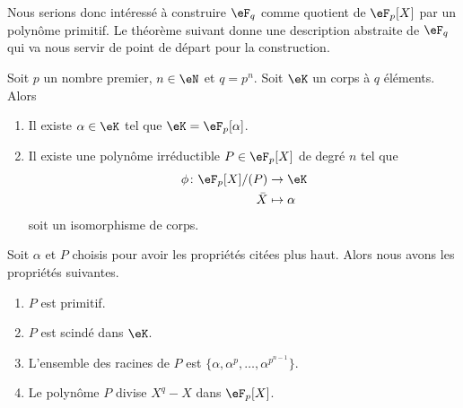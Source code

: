 Nous serions donc intéressé à construire $\eF_{q}$ comme quotient de \( \eF_p[X]\) par un polynôme primitif. Le théorème suivant donne une description abstraite de \( \eF_q\) qui va nous servir de point de départ pour la construction.
\begin{theorem}    \label{ThoqSludu}
    Soit \( p\) un nombre premier, \( n\in \eN\) et \( q=p^n\). Soit \( \eK\) un corps à \( q\) éléments. Alors
    \begin{enumerate}
        \item
            Il existe \( \alpha\in \eK\) tel que \( \eK=\eF_p[\alpha]\).
        \item
            Il existe une polynôme irréductible \( P\in\eF_p[X]\) de degré \( n\) tel que
            \begin{equation}        \label{EqWlMhhm}
                \begin{aligned}
                    \phi\colon \eF_p[X]/(P)&\to \eK \\
                    \bar X&\mapsto \alpha 
                \end{aligned}
            \end{equation}
            soit un isomorphisme de corps.
    \end{enumerate}
    Soit \( \alpha\) et \( P\) choisis pour avoir les propriétés citées plus haut. Alors nous avons les propriétés suivantes.
    \begin{enumerate}
        \item
            \( P\) est primitif.
        \item
            \( P\) est scindé dans \( \eK\).
        \item
            L'ensemble des racines de \( P\) est \( \{ \alpha,\alpha^p,\ldots, \alpha^{p^{n-1}} \}\).
        \item
            Le polynôme \( P\) divise \( X^q-X\) dans \( \eF_p[X]\).
    \end{enumerate}
\end{theorem}

